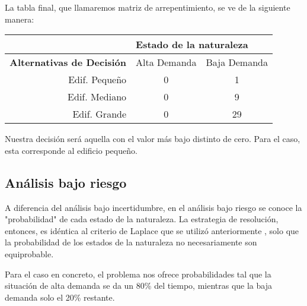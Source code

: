 La tabla final, que llamaremos matriz de arrepentimiento, se ve de la siguiente manera:

\begin{table}[H]
    \begin{tabular}{r|cc|}
        \cline{2-3}
        \multicolumn{1}{l|}{}                                   & \multicolumn{2}{l|}{\textbf{Estado de la naturaleza}}                                     \\ \hline
        \multicolumn{1}{|l|}{\textbf{Alternativas de Decisión}} & \multicolumn{1}{l|}{Alta Demanda}                     & \multicolumn{1}{l|}{Baja Demanda} \\ \hline
        \multicolumn{1}{|r|}{Edif. Pequeño}                     & \multicolumn{1}{c|}{0}                                & {\color[HTML]{333333} 1}          \\
        \multicolumn{1}{|r|}{Edif. Mediano}                     & \multicolumn{1}{c|}{0}                                & 9                                 \\
        \multicolumn{1}{|r|}{Edif. Grande}                      & \multicolumn{1}{c|}{{\color[HTML]{333333} 0}}         & 29                                \\ \hline
    \end{tabular}
\end{table}

Nuestra decisión será aquella con el valor más bajo distinto de cero. Para el caso, esta corresponde al edificio pequeño.

\subsection{Análisis bajo riesgo}
A diferencia del análisis bajo incertidumbre, en el análisis bajo riesgo se conoce la "probabilidad" de cada estado de la naturaleza. La estrategia de resolución, entonces, es idéntica al criterio de Laplace que se utilizó anteriormente , solo que la probabilidad de los estados de la naturaleza no necesariamente son equiprobable.

Para el caso en concreto, el problema nos ofrece probabilidades tal que la situación de alta demanda se da un 80\% del tiempo, mientras que la baja demanda solo el 20\% restante.



